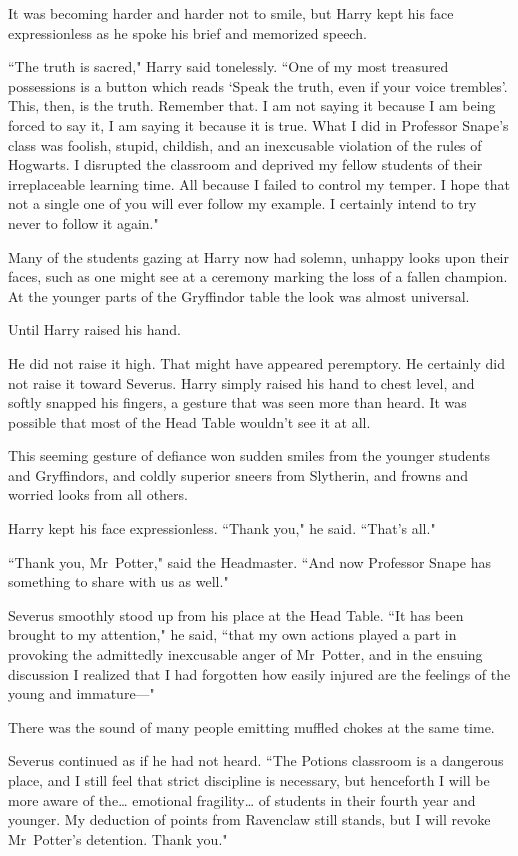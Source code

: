 It was becoming harder and harder not to smile, but Harry kept his face expressionless as he spoke his brief and memorized speech.

``The truth is sacred," Harry said tonelessly. ``One of my most treasured possessions is a button which reads `Speak the truth, even if your voice trembles'. This, then, is the truth. Remember that. I am not saying it because I am being forced to say it, I am saying it because it is true. What I did in Professor Snape's class was foolish, stupid, childish, and an inexcusable violation of the rules of Hogwarts. I disrupted the classroom and deprived my fellow students of their irreplaceable learning time. All because I failed to control my temper. I hope that not a single one of you will ever follow my example. I certainly intend to try never to follow it again."

Many of the students gazing at Harry now had solemn, unhappy looks upon their faces, such as one might see at a ceremony marking the loss of a fallen champion. At the younger parts of the Gryffindor table the look was almost universal.

Until Harry raised his hand.

He did not raise it high. That might have appeared peremptory. He certainly did not raise it toward Severus. Harry simply raised his hand to chest level, and softly snapped his fingers, a gesture that was seen more than heard. It was possible that most of the Head Table wouldn't see it at all.

This seeming gesture of defiance won sudden smiles from the younger students and Gryffindors, and coldly superior sneers from Slytherin, and frowns and worried looks from all others.

Harry kept his face expressionless. ``Thank you," he said. ``That's all."

``Thank you, Mr~Potter," said the Headmaster. ``And now Professor Snape has something to share with us as well."

Severus smoothly stood up from his place at the Head Table. ``It has been brought to my attention," he said, ``that my own actions played a part in provoking the admittedly inexcusable anger of Mr~Potter, and in the ensuing discussion I realized that I had forgotten how easily injured are the feelings of the young and immature—"

There was the sound of many people emitting muffled chokes at the same time.

Severus continued as if he had not heard. ``The Potions classroom is a dangerous place, and I still feel that strict discipline is necessary, but henceforth I will be more aware of the{\ldots} emotional fragility{\ldots} of students in their fourth year and younger. My deduction of points from Ravenclaw still stands, but I will revoke Mr~Potter's detention. Thank you."

